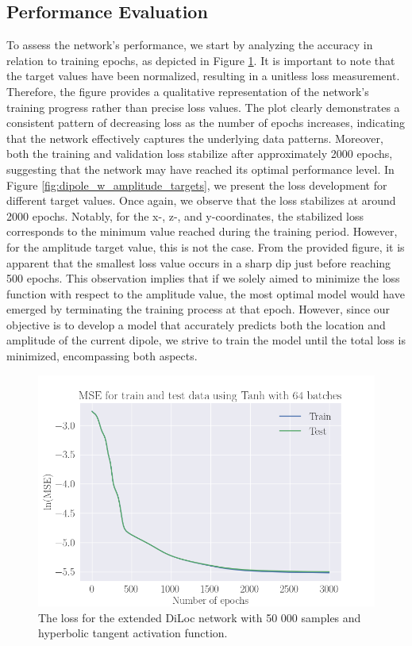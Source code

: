 \documentclass[a4paper, UKenglish, 11pt]{uiomaster}
\begin{document}
\subsection{Performance Evaluation}

To assess the network's performance, we start by analyzing the accuracy in relation to training epochs, as depicted in Figure \ref{fig:dipole_w_amplitude_loss}. It is important to note that the target values have been normalized, resulting in a unitless loss measurement. Therefore, the figure provides a qualitative representation of the network's training progress rather than precise loss values. The plot clearly demonstrates a consistent pattern of decreasing loss as the number of epochs increases, indicating that the network effectively captures the underlying data patterns. Moreover, both the training and validation loss stabilize after approximately 2000 epochs, suggesting that the network may have reached its optimal performance level. In Figure \ref{fig:dipole_w_amplitude_targets}, we present the loss development for different target values. Once again, we observe that the loss stabilizes at around 2000 epochs. Notably, for the x-, z-, and y-coordinates, the stabilized loss corresponds to the minimum value reached during the training period. However, for the amplitude target value, this is not the case. From the provided figure, it is apparent that the smallest loss value occurs in a sharp dip just before reaching 500 epochs. This observation implies that if we solely aimed to minimize the loss function with respect to the amplitude value, the most optimal model would have emerged by terminating the training process at that epoch. However, since our objective is to develop a model that accurately predicts both the location and amplitude of the current dipole, we strive to train the model until the total loss is minimized, encompassing both aspects.

\begin{figure}[!htb]
    \centering
    \includegraphics[width=\linewidth]{figures/MSE_tanh_50000_3july_mseloss_MSE_dipole_w_amplitude_3000_SGD_lr0.001_wd0.1_mom0.35_bs64_Tanh_64_3000_N_dipoles_1.png}
    \caption{The loss for the extended DiLoc network with 50 000 samples and hyperbolic tangent activation function.}
    \label{fig:dipole_w_amplitude_loss}
\end{figure}
\end{document}
